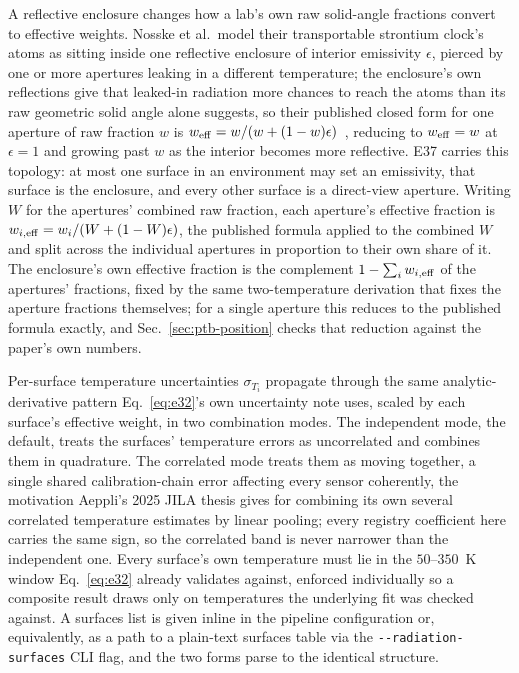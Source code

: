 \documentclass[aps,pra,superscriptaddress,groupedaddress,nofootinbib]{revtex4-2}
\begin{document}
A reflective enclosure changes how a lab's own raw solid-angle fractions
convert to effective weights. Nosske et al.\ model their transportable
strontium clock's atoms as sitting inside one reflective enclosure of
interior emissivity $\epsilon$, pierced by one or more apertures leaking in
a different temperature; the enclosure's own reflections give that leaked-in
radiation more chances to reach the atoms than its raw geometric solid angle
alone suggests, so their published closed form for one aperture of raw
fraction $w$ is $w_{\rm eff}=w/(w+(1-w)\epsilon)$~\cite{Nosske2025},
reducing to $w_{\rm eff}=w$ at $\epsilon=1$ and growing past $w$ as the
interior becomes more reflective. E37 carries this topology: at
most one surface in an environment may set an emissivity, that surface is
the enclosure, and every other surface is a direct-view aperture. Writing
$W$ for the apertures' combined raw fraction, each aperture's effective
fraction is $w_{i,\rm eff}=w_i/(W+(1-W)\epsilon)$, the published formula
applied to the combined $W$ and split across the individual apertures in
proportion to their own share of it. The enclosure's own effective fraction
is the complement $1-\sum_i w_{i,\rm eff}$ of the apertures' fractions,
fixed by the same two-temperature derivation that fixes the aperture
fractions themselves; for a single aperture this reduces to the published
formula exactly, and Sec.~\ref{sec:ptb-position} checks that reduction
against the paper's own numbers.

Per-surface temperature uncertainties $\sigma_{T_i}$ propagate through the
same analytic-derivative pattern Eq.~\eqref{eq:e32}'s own uncertainty note
uses, scaled by each surface's effective weight, in two combination modes.
The independent mode, the default, treats the surfaces' temperature errors
as uncorrelated and combines them in quadrature. The correlated mode treats
them as moving together, a single shared calibration-chain error affecting
every sensor coherently, the motivation Aeppli's 2025 JILA thesis gives for
combining its own several correlated temperature estimates by linear
pooling; every registry coefficient here carries the same sign, so the
correlated band is never narrower than the independent one. Every surface's
own temperature must lie in the $50$--$350$~K window Eq.~\eqref{eq:e32}
already validates against, enforced individually so a composite result
draws only on temperatures the underlying fit was checked against. A
surfaces list is given inline in the pipeline configuration or,
equivalently, as a path to a plain-text surfaces table via the
\texttt{-{}-radiation-surfaces} CLI flag, and the two forms parse to the
identical structure.
\end{document}
